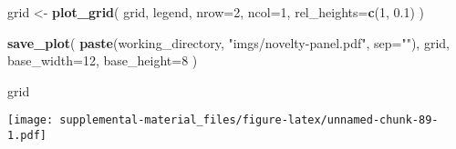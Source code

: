 \documentclass[]{book}
\newenvironment{Shaded}{\begin{snugshade}}{\end{snugshade}}
\newcommand{\DataTypeTok}[1]{\textcolor[rgb]{0.13,0.29,0.53}{#1}}
\newcommand{\DecValTok}[1]{\textcolor[rgb]{0.00,0.00,0.81}{#1}}
\newcommand{\FloatTok}[1]{\textcolor[rgb]{0.00,0.00,0.81}{#1}}
\newcommand{\KeywordTok}[1]{\textcolor[rgb]{0.13,0.29,0.53}{\textbf{#1}}}
\newcommand{\NormalTok}[1]{#1}
\newcommand{\StringTok}[1]{\textcolor[rgb]{0.31,0.60,0.02}{#1}}
\begin{document}
\begin{Shaded}
\begin{Highlighting}[]
\NormalTok{grid <-}\StringTok{ }\KeywordTok{plot_grid}\NormalTok{(}
\NormalTok{  grid,}
\NormalTok{  legend,}
  \DataTypeTok{nrow=}\DecValTok{2}\NormalTok{,}
  \DataTypeTok{ncol=}\DecValTok{1}\NormalTok{,}
  \DataTypeTok{rel_heights=}\KeywordTok{c}\NormalTok{(}\DecValTok{1}\NormalTok{, }\FloatTok{0.1}\NormalTok{)}
\NormalTok{)}

\KeywordTok{save_plot}\NormalTok{(}
  \KeywordTok{paste}\NormalTok{(working_directory, }\StringTok{"imgs/novelty-panel.pdf"}\NormalTok{, }\DataTypeTok{sep=}\StringTok{""}\NormalTok{),}
\NormalTok{  grid,}
  \DataTypeTok{base_width=}\DecValTok{12}\NormalTok{,}
  \DataTypeTok{base_height=}\DecValTok{8}
\NormalTok{)}

\NormalTok{grid}
\end{Highlighting}
\end{Shaded}

\texttt{[image: supplemental-material\_files/figure-latex/unnamed-chunk-89-1.pdf]}


\end{document}
